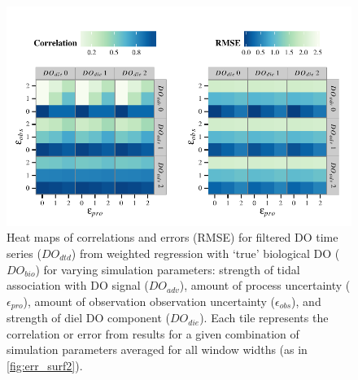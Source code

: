 \documentclass[letterpaper,12pt,oneside]{article}\usepackage[]{graphicx}\usepackage[]{color}
\makeatletter
\def\maxwidth{ %
  \ifdim\Gin@nat@width>\linewidth
    \linewidth
  \else
    \Gin@nat@width
  \fi
}
\newenvironment{knitrout}{}{} %
\makeatother
\begin{document}
\centering\vspace*{\fill}
\begin{knitrout}
\color{fgcolor}\begin{figure}[!ht]


{\centering \includegraphics[width=\maxwidth]{figure/err_surf1} 

}

\caption[Heat maps of correlations and errors (\ac{RMSE}) for filtered \ac{DO} time series ($DO_{dtd}$) from weighted regression with `true' biological \ac{DO} ($DO_{bio}$) for varying simulation parameters]{Heat maps of correlations and errors (\ac{RMSE}) for filtered \ac{DO} time series ($DO_{dtd}$) from weighted regression with `true' biological \ac{DO} ($DO_{bio}$) for varying simulation parameters: strength of tidal association with \ac{DO} signal ($DO_{adv}$), amount of process uncertainty ($\epsilon_{pro}$), amount of observation observation uncertainty ($\epsilon_{obs}$), and strength of diel \ac{DO} component ($DO_{die}$).  Each tile represents the correlation or error from results for a given combination of simulation parameters averaged for all window widths (as in \cref{fig:err_surf2}).\label{fig:err_surf1}}
\end{figure}


\end{knitrout}
\vfill
\clearpage
\end{document}

